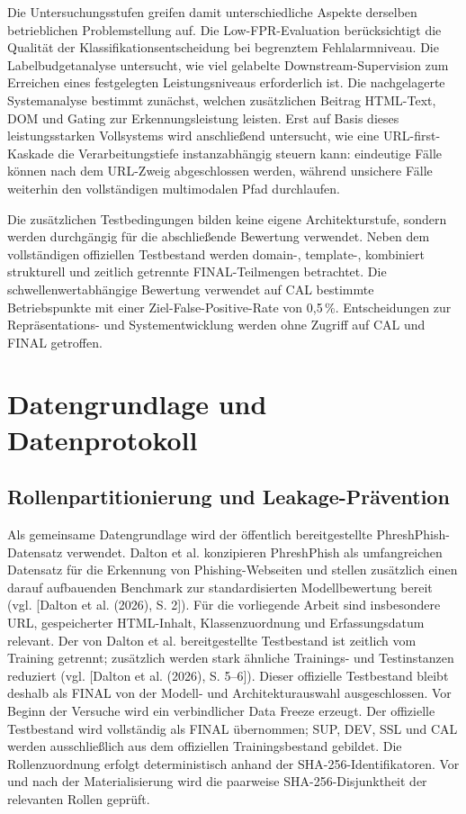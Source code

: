 Die Untersuchungsstufen greifen damit unterschiedliche Aspekte derselben betrieblichen
Problemstellung auf. Die Low-FPR-Evaluation berücksichtigt die Qualität der
Klassifikationsentscheidung bei begrenztem Fehlalarmniveau. Die Labelbudgetanalyse untersucht,
wie viel gelabelte Downstream-Supervision zum Erreichen eines festgelegten Leistungsniveaus
erforderlich ist. Die nachgelagerte Systemanalyse bestimmt zunächst, welchen zusätzlichen
Beitrag HTML-Text, DOM und Gating zur Erkennungsleistung leisten. Erst auf Basis dieses
leistungsstarken Vollsystems wird anschließend untersucht, wie eine URL-first-Kaskade die
Verarbeitungstiefe instanzabhängig steuern kann: eindeutige Fälle können nach dem URL-Zweig
abgeschlossen werden, während unsichere Fälle weiterhin den vollständigen multimodalen Pfad
durchlaufen.

Die zusätzlichen Testbedingungen bilden keine eigene Architekturstufe, sondern werden
durchgängig für die abschließende Bewertung verwendet. Neben dem vollständigen offiziellen
Testbestand werden domain-, template-, kombiniert strukturell und zeitlich getrennte
FINAL-Teilmengen betrachtet. Die schwellenwertabhängige Bewertung verwendet auf CAL
bestimmte Betriebspunkte mit einer Ziel-False-Positive-Rate von 0,5\,\%. Entscheidungen zur
Repräsentations- und Systementwicklung werden ohne Zugriff auf CAL und FINAL getroffen.

\section{Datengrundlage und Datenprotokoll}

\subsection{Rollenpartitionierung und Leakage-Prävention}

Als gemeinsame Datengrundlage wird der öffentlich bereitgestellte PhreshPhish-Datensatz
verwendet. Dalton et al. konzipieren PhreshPhish als umfangreichen Datensatz für die Erkennung
von Phishing-Webseiten und stellen zusätzlich einen darauf aufbauenden Benchmark zur
standardisierten Modellbewertung bereit (vgl. [Dalton et al. (2026), S. 2]). Für die vorliegende
Arbeit sind insbesondere URL, gespeicherter HTML-Inhalt, Klassenzuordnung und
Erfassungsdatum relevant. Der von Dalton et al. bereitgestellte Testbestand ist zeitlich vom
Training getrennt; zusätzlich werden stark ähnliche Trainings- und Testinstanzen reduziert
(vgl. [Dalton et al. (2026), S. 5--6]). Dieser offizielle Testbestand bleibt deshalb als FINAL von
der Modell- und Architekturauswahl ausgeschlossen. Vor Beginn der Versuche wird ein verbindlicher Data Freeze erzeugt. Der offizielle Testbestand
wird vollständig als FINAL übernommen; SUP, DEV, SSL und CAL werden ausschließlich aus
dem offiziellen Trainingsbestand gebildet. Die Rollenzuordnung erfolgt deterministisch anhand
der SHA-256-Identifikatoren. Vor und nach der Materialisierung wird die paarweise
SHA-256-Disjunktheit der relevanten Rollen geprüft.

